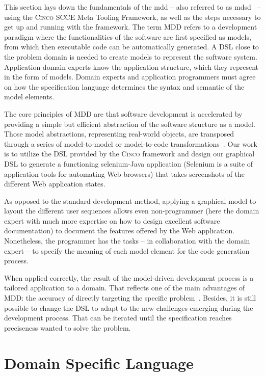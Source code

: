 This section lays down the fundamentals of the \gls{mdd} -- also referred to as \gls{mdsd}~\cite{fowler} --  using the \textsc{Cinco} SCCE Meta Tooling Framework, as well as the steps necessary to get up and running with the framework. The term MDD refers to a development paradigm where the functionalities of the software are first specified as models, from which then executable code can be automatically generated. A DSL close to the problem domain is needed to create models to represent the software system. Application domain experts know the application structure, which they represent in the form of models. Domain experts and application programmers must agree on how the specification language determines the syntax and semantic of the model elements.

The core principles of MDD are that software development is accelerated by providing a simple but efficient abstraction of the software structure as a model. Those model abstractions, representing real-world objects, are transposed through a series of model-to-model or model-to-code transformations~\cite{stahl_et_al}. Our work is to utilize the DSL provided by the \textsc{Cinco} framework and design our graphical DSL to generate a functioning \gls*{selenium}-Java application (Selenium is a suite of application tools for automating Web browsers) that takes screenshots of the different Web application states.

As opposed to the standard development method, applying a graphical model to layout the different user sequences allows even non-programmer (here the domain expert with much more expertise on how to design excellent software documentation) to document the features offered by the Web application. Nonetheless, the programmer has the tasks -- in collaboration with the domain expert -- to specify the meaning of each model element for the code generation process. 

When applied correctly, the result of the model-driven development process is a tailored application to a domain. That reflects one of the main advantages of MDD: the accuracy of directly targeting the specific problem~\cite{brambilla2017model}. Besides, it is still possible to change the DSL to adapt to the new challenges emerging during the development process. That can be iterated until the specification reaches preciseness wanted to solve the problem.

\section{Domain Specific Language}\label{sec:DSL}

